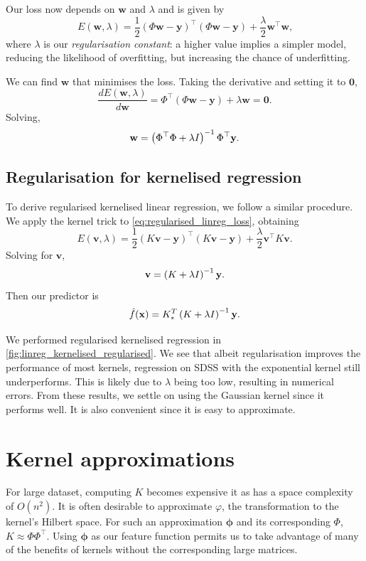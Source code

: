 \documentclass[11pt,twoside,openright]{report}
\newcommand\bphi{\bm{\phi}}
\newcommand\bv{\mathbf{v}}
\newcommand\bw{\mathbf{w}}
\newcommand\bx{\mathbf{x}}
\newcommand\by{\mathbf{y}}
\begin{document}
Our loss now depends on $\bw$ and $\lambda$ and is given by \begin{equation}
    E(\bw, \lambda) = \frac12\left(\Phi \bw - \by\right)^\top\left(\Phi \bw - \by\right) + \frac{\lambda}{2}\bw^\top\bw \text{,}  \label{eq:regularised_linreg_loss}
\end{equation} where $\lambda$ is our \textit{regularisation constant}: a higher value implies a simpler model, reducing the likelihood of overfitting, but increasing the chance of underfitting.

We can find $\bw$ that minimises the loss. Taking the derivative and setting it to $\mathbf{0}$,\[
    \frac{dE(\bw, \lambda)}{d\bw} = \Phi^\top(\Phi\bw - \by) + \lambda \bw = \mathbf{0} \text{.}
\] Solving,\[
    \bw = \left(\Phi^\top\Phi + \lambda I\right)^{-1}\Phi^\top\by \text.
\]

\subsection{Regularisation for kernelised regression}

To derive regularised kernelised linear regression, we follow a similar procedure. We apply the kernel trick to \cref{eq:regularised_linreg_loss}, obtaining \[
  E(\bv, \lambda) = \frac12\left( K \bv - \by\right)^\top\left(K \bv - \by\right) + \frac{\lambda}{2}\bv^\top K \bv \text{.}
\] Solving for $\bv$,\[
  \bv = \left(K + \lambda I \right)^{-1} \by \text.
\] Then our predictor is \[
  \hat f(\bx) = K_*^T \left(K + \lambda I \right)^{-1} \by \text.
\]

We performed regularised kernelised regression in \cref{fig:linreg_kernelised_regularised}. We see that albeit regularisation improves the performance of most kernels, regression on SDSS with the exponential kernel still underperforms. This is likely due to $\lambda$ being too low, resulting in numerical errors. From these results, we settle on using the Gaussian kernel since it performs well. It is also convenient since it is easy to approximate.

\section{Kernel approximations}

For large dataset, computing $K$ becomes expensive it as has a space complexity of $O(n^2)$. It is often desirable to approximate $\varphi$, the transformation to the kernel's Hilbert space. For such an approximation $\bphi$ and its corresponding $\Phi$, $K \approx \Phi\Phi^\top$. Using $\bphi$ as our feature function permits us to take advantage of many of the benefits of kernels without the corresponding large matrices.
\end{document}
